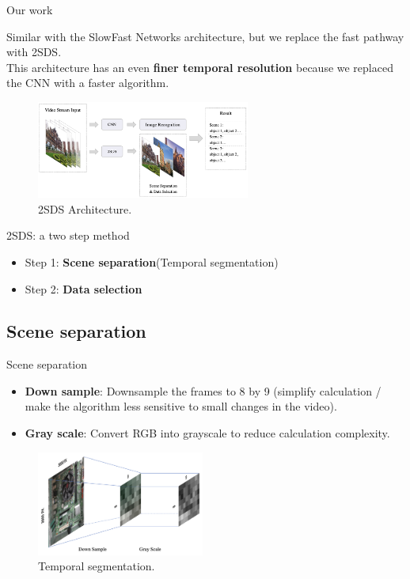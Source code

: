 \documentclass[aspectratio=43,display]{beamer}
\begin{document}
			\begin{frame}{Our work}

				Similar with the SlowFast Networks architecture, but we replace the fast pathway with 2SDS. \\
				This architecture has an even \textbf{finer temporal resolution} because we replaced the CNN with a faster algorithm.

				\vskip 0.2cm

				\begin{figure}
					\includegraphics[width=7cm]{images/2SDS.png}
					\caption{\label{fig:2SDS}2SDS Architecture.}
				\end{figure}

			\end{frame}

			\begin{frame}{2SDS: a two step method}

				\begin{itemize}
					\item Step 1: \textbf{Scene separation}(Temporal segmentation)
					\item Step 2: \textbf{Data selection}
				\end{itemize}

			\end{frame}

		\subsection{Scene separation}

			\begin{frame}{Scene separation}

				\begin{itemize}
					\item \textbf{Down sample}: Downsample the frames to 8 by 9 
					(simplify calculation / make the algorithm less sensitive to small changes in the video).
					\item \textbf{Gray scale}: Convert RGB into grayscale to reduce calculation complexity.
				\end{itemize}

				\begin{figure}
					\includegraphics[width=5.5cm]{images/down-sample-grayscale.png}
					\caption{\label{fig:Scene-Separation}Temporal segmentation.}
				\end{figure}

			\end{frame}
\end{document}
